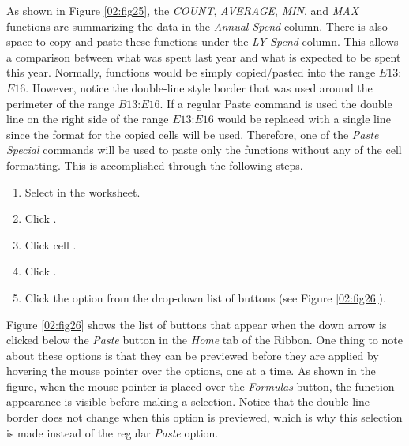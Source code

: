 As shown in Figure \ref{02:fig25}, the \textit{COUNT}, \textit{AVERAGE}, \textit{MIN}, and \textit{MAX} functions are summarizing the data in the \textit{Annual Spend} column. There is also space to copy and paste these functions under the \textit{LY Spend} column. This allows a comparison between what was spent last year and what is expected to be spent this year. Normally, functions would be simply copied/pasted into the range $ E13 $:$ E16 $. However, notice the double-line style border that was used around the perimeter of the range $ B13 $:$ E16 $. If a regular Paste command is used the double line on the right side of the range $ E13 $:$ E16 $ would be replaced with a single line since the format for the copied cells will be used. Therefore, one of the \textit{Paste Special} commands will be used to paste only the functions without any of the cell formatting. This is accomplished through the following steps.

\begin{enumerate}
	\item Select  in the  worksheet.
	\item Click .
	\item Click cell .
	\item Click .
	\item Click the  option from the drop-down list of buttons (see Figure \ref{02:fig26}).
\end{enumerate}

Figure \ref{02:fig26} shows the list of buttons that appear when the down arrow is clicked below the \textit{Paste} button in the \textit{Home} tab of the Ribbon. One thing to note about these options is that they can be previewed before they are applied by hovering the mouse pointer over the options, one at a time. As shown in the figure, when the mouse pointer is placed over the \textit{Formulas} button, the function appearance is visible before making a selection. Notice that the double-line border does not change when this option is previewed, which is why this selection is made instead of the regular \textit{Paste} option.

